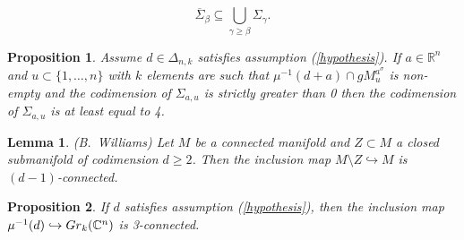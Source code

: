 \documentclass[10pt,a4paper]{amsart}
\newtheorem{prop}{Proposition}
\newtheorem{lem}{Lemma}
\newcommand{\CC}{\mathbb C}
\newcommand{\RR}{\mathbb R}
\begin{document}
\begin{equation} \overline{\Sigma}_\beta \subseteq \bigcup_{\gamma \ge \beta} \Sigma_\gamma.\end{equation} 

\begin{prop} \label{prop1ton}
Assume $d\in \Delta_{n,k}$ satisfies  assumption (\ref{hypothesis}). If $a\in \RR^n$ and $u\subset \{1, \ldots, n\}$ with $k$ elements are such that 
$\mu^{-1}(d+a) \cap g M_{u}^{{a}^\sigma}$ 
is non-empty and the codimension of $\Sigma_{a,u}$ is strictly greater than 0
then the codimension of $\Sigma_{a,u}$  is at least equal to 4.
\end{prop}

\begin{lem}  \label{cs} {\rm (B.~Williams)} Let $M$ be a connected manifold and $Z\subset M$ a closed submanifold of codimension $d\ge 2$. Then the inclusion map 
$M\setminus Z \hookrightarrow M$ is $(d-1)$-connected.  
\end{lem}

\begin{prop} \label{key} If $d$ satisfies assumption (\ref{hypothesis}), then the inclusion map
$\mu^{-1}(d) \hookrightarrow  {\rm Gr}_k(\CC^n)$ is 3-connected.
\end{prop} 
\end{document}
